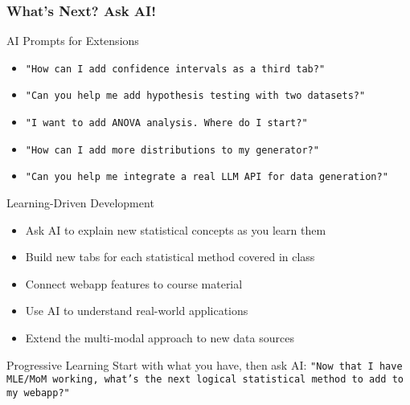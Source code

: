 \documentclass[aspectratio=169]{beamer}
\begin{document}
\begin{frame}
\frametitle{What's Next? Ask AI!}
\begin{alertblock}{AI Prompts for Extensions}
\begin{itemize}
\item \texttt{"How can I add confidence intervals as a third tab?"}
\item \texttt{"Can you help me add hypothesis testing with two datasets?"}
\item \texttt{"I want to add ANOVA analysis. Where do I start?"}
\item \texttt{"How can I add more distributions to my generator?"}
\item \texttt{"Can you help me integrate a real LLM API for data generation?"}
\end{itemize}
\end{alertblock}

\begin{exampleblock}{Learning-Driven Development}
\begin{itemize}
\item Ask AI to explain new statistical concepts as you learn them
\item Build new tabs for each statistical method covered in class
\item Connect webapp features to course material
\item Use AI to understand real-world applications
\item Extend the multi-modal approach to new data sources
\end{itemize}
\end{exampleblock}

\begin{alertblock}{Progressive Learning}
Start with what you have, then ask AI: \texttt{"Now that I have MLE/MoM working, what's the next logical statistical method to add to my webapp?"}
\end{alertblock}
\end{frame}
\end{document}
